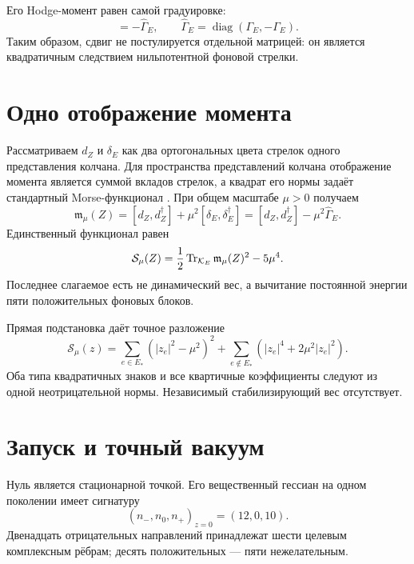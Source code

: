 Его Hodge-момент равен самой градуировке:
\begin{equation}
 [\delta_E,\delta_E^\dagger]
 =-\widehat\Gamma_E,
 \qquad
 \widehat\Gamma_E=\operatorname{diag}(\Gamma_E,-\Gamma_E).
 \label{eq:v7-edge-hodge-derived-grading}
\end{equation}
Таким образом, сдвиг не постулируется отдельной матрицей: он является
квадратичным следствием нильпотентной фоновой стрелки.

\section{Одно отображение момента}

Рассматриваем $d_Z$ и $\delta_E$ как два ортогональных цвета стрелок одного
представления колчана. Для пространства представлений колчана отображение
момента является суммой вкладов стрелок, а квадрат его нормы задаёт
стандартный Morse-функционал \cite{v7-edge-hodge-quiver-moment}.
При общем масштабе $\mu>0$ получаем
\begin{equation}
 \mathfrak m_\mu(Z)
 =[d_Z,d_Z^\dagger]
 +\mu^2[\delta_E,\delta_E^\dagger]
 =[d_Z,d_Z^\dagger]-\mu^2\widehat\Gamma_E.
 \label{eq:v7-edge-hodge-total-moment}
\end{equation}
Единственный функционал равен
\begin{equation}
 \mathcal S_\mu(Z)
 =\frac12\operatorname{Tr}_{\mathcal K_E}\mathfrak m_\mu(Z)^2
 -5\mu^4.
 \label{eq:v7-edge-hodge-action}
\end{equation}
Последнее слагаемое есть не динамический вес, а вычитание постоянной
энергии пяти положительных фоновых блоков.

Прямая подстановка даёт точное разложение
\begin{equation}
 \boxed{
 \mathcal S_\mu(z)
 =\sum_{e\in E_*}(|z_e|^2-\mu^2)^2
 +\sum_{e\notin E_*}(|z_e|^4+2\mu^2|z_e|^2).}
 \label{eq:v7-edge-hodge-reduced-action}
\end{equation}
Оба типа квадратичных знаков и все квартичные коэффициенты следуют из одной
неотрицательной нормы. Независимый стабилизирующий вес отсутствует.

\section{Запуск и точный вакуум}

Нуль является стационарной точкой. Его вещественный гессиан на одном
поколении имеет сигнатуру
\begin{equation}
 (n_-,n_0,n_+)_{z=0}=(12,0,10).
 \label{eq:v7-edge-hodge-origin-hessian}
\end{equation}
Двенадцать отрицательных направлений принадлежат шести целевым комплексным
рёбрам; десять положительных --- пяти нежелательным.

